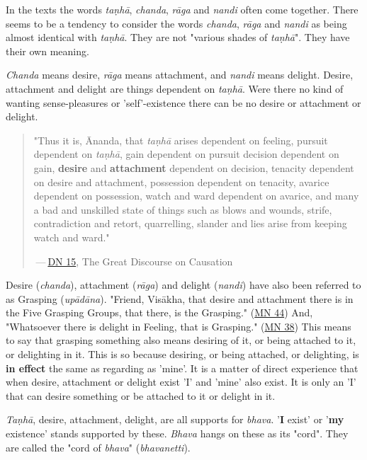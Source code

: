 In the texts the words \emph{taṇhā}, \emph{chanda}, \emph{rāga} and \emph{nandi} often
come together. There seems to be a tendency to consider the words
\emph{chanda}, \emph{rāga} and \emph{nandi} as being almost identical with \emph{taṇhā}.
They are not "various shades of \emph{taṇhā}". They have their own meaning.


\emph{Chanda} means desire, \emph{rāga} means attachment, and \emph{nandi} means
delight. Desire, attachment and delight are things dependent on
\emph{taṇhā}. Were there no kind of wanting sense-pleasures or
'self'-existence there can be no desire or attachment or delight.


\begin{quotation}
"Thus it is, Ānanda, that \emph{taṇhā} arises dependent on feeling, pursuit
dependent on \emph{taṇhā}, gain dependent on pursuit decision dependent on
gain, \textbf{desire} and \textbf{attachment} dependent on decision, tenacity
dependent on desire and attachment, possession dependent on tenacity,
avarice dependent on possession, watch and ward dependent on avarice,
and many a bad and unskilled state of things such as blows and wounds,
strife, contradiction and retort, quarrelling, slander and lies arise
from keeping watch and ward."


 — \href{https://suttacentral.net/dn15/en/bodhi}{DN 15}, The Great Discourse on Causation


\end{quotation}

Desire (\emph{chanda}), attachment (\emph{rāga}) and delight (\emph{nandi}) have
also been referred to as Grasping (\emph{upādāna}). "Friend, Visākha, that
desire and attachment there is in the Five Grasping Groups, that there,
is the Grasping." (\href{https://suttacentral.net/mn44/en/sujato}{MN 44})
And, "Whatsoever there
is delight in Feeling, that is Grasping." (\href{https://suttacentral.net/mn38/en/bodhi}{MN 38})
This means to say that grasping something also means desiring of it, or
being attached to it, or delighting in it. This is so because desiring,
or being attached, or delighting, is \textbf{in effect} the same as regarding
as 'mine'. It is a matter of direct experience that when desire,
attachment or delight exist 'I' and 'mine' also exist. It is only an 'I'
that can desire something or be attached to it or delight in it.


\emph{Taṇhā}, desire, attachment, delight, are all supports for \emph{bhava}.
'\textbf{I} exist' or '\textbf{my} existence' stands supported by these. \emph{Bhava}
hangs on these as its "cord". They are called the "cord of \emph{bhava}"
(\emph{bhavanetti}).


